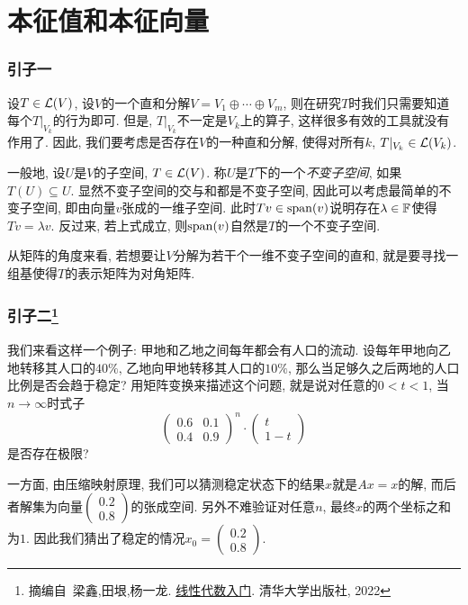 \chapter{本征值和本征向量}

\subsection*{引子一}

设$T \in \mathcal{L} (V)$, 设$V$的一个直和分解$V=V_1 \oplus \cdots \oplus V_m$, 则在研究$T$时我们只需要知道每个$T|_{V_k}$的行为即可. 但是, $T|_{V_k}$不一定是$V_k$上的算子, 这样很多有效的工具就没有作用了. 因此, 我们要考虑是否存在$V$的一种直和分解, 使得对所有$k$, $T|_{V_k} \in \mathcal{L} (V_k)$. 

一般地, 设$U$是$V$的子空间, $T\in \mathcal{L} (V)$. 称$U$是$T$下的一个\textit{不变子空间}, 如果$T(U) \subseteq U$. 显然不变子空间的交与和都是不变子空间, 因此可以考虑最简单的不变子空间, 即由向量$v$张成的一维子空间. 此时$Tv \in \operatorname{span} (v)$说明存在$\lambda \in \mathbb{F}$使得$Tv=\lambda v$. 反过来, 若上式成立, 则$\operatorname{span} (v)$自然是$T$的一个不变子空间. 

从矩阵的角度来看, 若想要让$V$分解为若干个一维不变子空间的直和, 就是要寻找一组基使得$T$的表示矩阵为对角矩阵. 

\subsection*{引子二\footnote{摘编自~梁鑫,田垠,杨一龙. \underline{线性代数入门}. 清华大学出版社, 2022}}

我们来看这样一个例子: 甲地和乙地之间每年都会有人口的流动. 设每年甲地向乙地转移其人口的$40 \%$, 乙地向甲地转移其人口的$10 \%$, 那么当足够久之后两地的人口比例是否会趋于稳定? 用矩阵变换来描述这个问题, 就是说对任意的$0<t<1$, 当$n\to \infty$时式子$$
\begin{pmatrix}
 0.6 & 0.1\\
 0.4 & 0.9
\end{pmatrix}^n \cdot \begin{pmatrix}
t \\
1-t
\end{pmatrix}$$
是否存在极限? 

一方面, 由压缩映射原理, 我们可以猜测稳定状态下的结果$x$就是$Ax=x$的解, 而后者解集为向量$\begin{pmatrix}
0.2 \\ 0.8
\end{pmatrix}$的张成空间. 另外不难验证对任意$n$, 最终$x$的两个坐标之和为$1$. 因此我们猜出了稳定的情况$x_0=\begin{pmatrix}
0.2 \\ 0.8
\end{pmatrix}$. 

